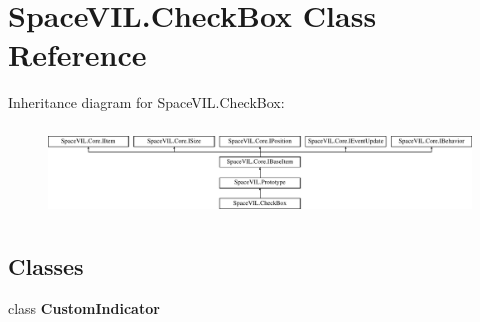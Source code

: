 \hypertarget{class_space_v_i_l_1_1_check_box}{}\section{Space\+V\+I\+L.\+Check\+Box Class Reference}
\label{class_space_v_i_l_1_1_check_box}
Inheritance diagram for Space\+V\+I\+L.\+Check\+Box\+:\begin{figure}[H]
\begin{center}
\leavevmode
\includegraphics[height=2.421622cm]{class_space_v_i_l_1_1_check_box}
\end{center}
\end{figure}
\subsection*{Classes}
\begin{DoxyCompactItemize}
\item 
class {\bfseries Custom\+Indicator}
\end{DoxyCompactItemize}
